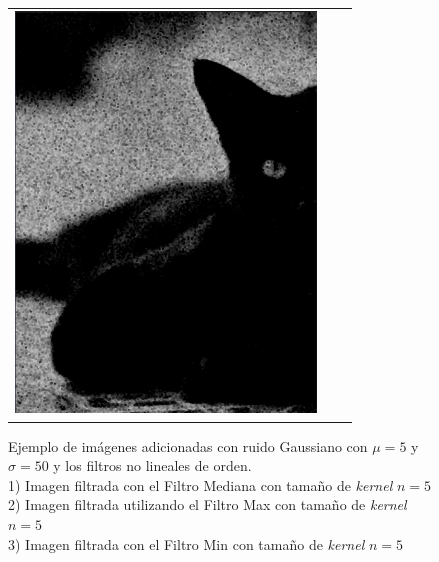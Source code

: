 \begin{landscape}
\begin{figure}[!h]
\begin{tabular}{ccc}
				\includegraphics[width=8cm]{Imagenes/Ruido_Gauss_5_50_min_5.png}
			\end{tabular}
			\label{Ruido_Gauss_Filtros_no_lineales}
			\caption{Ejemplo de imágenes adicionadas con ruido Gaussiano con $\mu = 5$ y $\sigma = 50$ y los filtros no lineales de orden. \\ 1) Imagen filtrada con el Filtro Mediana con tamaño de \textit{kernel} $n = 5$ \\ 2) Imagen filtrada utilizando el Filtro Max con tamaño de \textit{kernel} $n = 5$ \\ 3) Imagen filtrada con el Filtro Min con tamaño de \textit{kernel} $n = 5$ }
		\end{figure}
	
		\newpage
		

\end{landscape}
